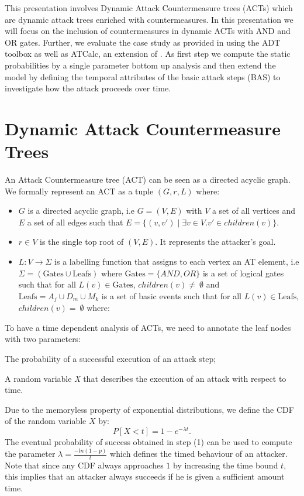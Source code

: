 \documentclass[submission,copyright,creativecommons]{eptcs}
\begin{document}
This presentation involves Dynamic Attack Countermeasure trees (ACTs) which are dynamic attack trees enriched with countermeasures. In this presentation we will focus on the inclusion of countermeasures in dynamic ACTs with AND and OR gates. Further, we evaluate the case study as provided in \cite{ACT} using the ADT toolbox\cite{ADT} as well as ATCalc, an extension of \cite{ATCalc}. As first step we compute the static probabilities by a single parameter bottom up analysis and then extend the model by defining the temporal attributes of the basic attack steps (BAS) to investigate how the attack proceeds over time.

\section{Dynamic Attack Countermeasure Trees}

An Attack Countermeasure tree (ACT) can be seen as a directed acyclic graph. We formally represent an ACT as a tuple $(G,r,L)$ where:
\begin{itemize}
\item $G$ is a directed acyclic graph, i.e $ G=(V,E) $ with $V$ a set of all vertices and $E$ a set of all edges such that $E=\{(v,v') \mid \exists v\in V. v'\in children(v)\}$. 
\item $r\in V$ is the single top root of $(V, E)$. It represents the attacker's goal.
\item $L:V\rightarrow\Sigma$ is a labelling function that assigns to each vertex an AT element, i.e $\Sigma=(\text{Gates} \cup \text{Leafs}) $ where $\text{Gates}  = \{AND,OR\}$ is a set of logical gates such that for all $L(v) \in \text{Gates}$, $children(v) \neq~\emptyset $ and  $\text{Leafs} = A _{j} \cup D _{m} \cup M _{k}$ is a set of basic events such that for all $L(v) \in \text{Leafs}$, $children(v) =~\emptyset $ where:
\end{itemize}
To have a time dependent analysis of ACTs, we need to annotate the leaf nodes with two parameters:
\begin{inparaenum}
\item The probability of a successful execution of an attack step;
\item A random variable \textit{X} that describes the execution of an attack with respect to time.
\end{inparaenum}
Due to the memoryless property of exponential distributions, we define the CDF of the random variable $X$ by:$$ P[X<t]=1-e^{{-\lambda}t}.$$
The eventual probability of success obtained in step (1) can be used to compute the parameter $\lambda=\frac{-ln(1-p)}{t}$ which defines the timed behaviour of an attacker. Note that since any CDF always approaches $1$ by increasing the time bound $t$, this implies that an attacker always succeeds if he is given a sufficient amount time.
\end{document}
